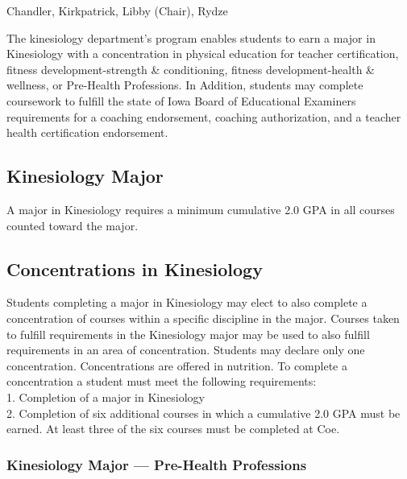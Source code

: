 \documentclass[
  letterpaper,
]{scrbook}
\begin{document}
Chandler, Kirkpatrick, Libby (Chair), Rydze

The kinesiology department's program enables students to earn a major in
Kinesiology with a concentration in physical education for teacher
certification, fitness development-strength \& conditioning, fitness
development-health \& wellness, or Pre-Health Professions. In Addition,
students may complete coursework to fulfill the state of Iowa Board of
Educational Examiners requirements for a coaching endorsement, coaching
authorization, and a teacher health certification endorsement.

\subsection{Kinesiology Major}\label{kinesiology-major}

A major in Kinesiology requires a minimum cumulative 2.0 GPA in all
courses counted toward the major.

\subsection{Concentrations in
Kinesiology}\label{concentrations-in-kinesiology}

Students completing a major in Kinesiology may elect to also complete a
concentration of courses within a specific discipline in the major.
Courses taken to fulfill requirements in the Kinesiology major may be
used to also fulfill requirements in an area of concentration. Students
may declare only one concentration. Concentrations are offered in
nutrition. To complete a concentration a student must meet the following
requirements:\\
1. Completion of a major in Kinesiology\\
2. Completion of six additional courses in which a cumulative 2.0 GPA
must be earned. At least three of the six courses must be completed at
Coe.

\subsubsection{Kinesiology Major --- Pre-Health
Professions}\label{kinesiology-major-pre-health-professions}
\end{document}
